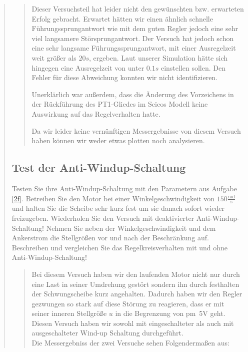 \begin{quote}
    \begin{quote}
        
        Dieser Versuchsteil hat leider nicht den gewünschten bzw. erwarteten Erfolg gebracht. Erwartet hätten wir einen
        ähnlich schnelle Führungssprungantwort wie mit dem guten Regler jedoch eine sehr viel langsamere
        Störsprungantwort. Der Versuch hat jedoch schon eine sehr langsame Führungssprungantwort, mit
        einer Ausregelzeit weit größer als $20 s$, ergeben. Laut unserer Simulation hätte sich hingegen eine Ausregelzeit von
        unter $0.1 s$ einstellen sollen. Den Fehler für diese Abweichung konnten wir nicht identifizieren.\vspace{1em}
        
        Unerklärlich war außerdem, dass die Änderung des Vorzeichens in der Rückführung des PT1-Gliedes im Scicos Modell
        keine Auswirkung auf das Regelverhalten hatte.\vspace{1em}
        
        Da wir leider keine vernünftigen Messergebnisse von diesem Versuch haben können wir weder etwas plotten noch
        analysieren.
        
        
    \end{quote}
    
    
    \subsection{Test der Anti-Windup-Schaltung}
    Testen Sie ihre Anti-Windup-Schaltung mit den Parametern aus Aufgabe \ref{2f}. Betreiben Sie den Motor bei einer
    Winkelgeschwindigkeit von $150 \mathrm{\frac{rad}{s}}$ und halten Sie die Scheibe sehr kurz fest um sie danach sofort wieder
    freizugeben. Wiederholen Sie den Versuch mit deaktivierter Anti-Windup-Schaltung! Nehmen Sie neben der Winkelgeschwindigkeit
    und dem Ankerstrom die Stellgrößen vor und nach der Beschränkung auf. Beschreiben und vergleichen Sie das Regelkreisverhalten
    mit und ohne Anti-Windup-Schaltung!
    
    \begin{quote}
        
        Bei diesem Versuch haben wir den laufenden Motor nicht nur durch eine Last in seiner Umdrehung gestört sondern ihn durch
        festhalten der Schwungscheibe kurz angehalten. Dadurch haben wir den Regler gezwungen so stark auf diese Störung zu
        reagieren, dass er mit seiner inneren Stellgröße $u$ in die Begrenzung von \si{\pm5}{V} geht. Diesen Versuch haben wir
        sowohl mit eingeschalteter als auch mit ausgeschalteter Wind-up Schaltung durchgeführt.\\
        Die Messergebniss der zwei Versuche sehen Folgendermaßen aus:


\end{quote}
\end{quote}
